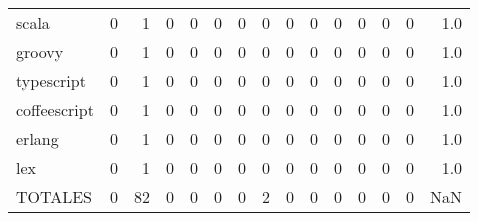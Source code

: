 \begin{tabular}{lrrrrrrrrrrrrrr}
scala        &        0 &       1 &          0 &               0 &                0 &       0 &          0 &          0 &         0 &         0 &      0 &             0 &         0 &      1.0 \\
groovy       &        0 &       1 &          0 &               0 &                0 &       0 &          0 &          0 &         0 &         0 &      0 &             0 &         0 &      1.0 \\
typescript   &        0 &       1 &          0 &               0 &                0 &       0 &          0 &          0 &         0 &         0 &      0 &             0 &         0 &      1.0 \\
coffeescript &        0 &       1 &          0 &               0 &                0 &       0 &          0 &          0 &         0 &         0 &      0 &             0 &         0 &      1.0 \\
erlang       &        0 &       1 &          0 &               0 &                0 &       0 &          0 &          0 &         0 &         0 &      0 &             0 &         0 &      1.0 \\
lex          &        0 &       1 &          0 &               0 &                0 &       0 &          0 &          0 &         0 &         0 &      0 &             0 &         0 &      1.0 \\
TOTALES      &        0 &      82 &          0 &               0 &                0 &       0 &          2 &          0 &         0 &         0 &      0 &             0 &         0 &      NaN \\
\bottomrule
\end{tabular}
